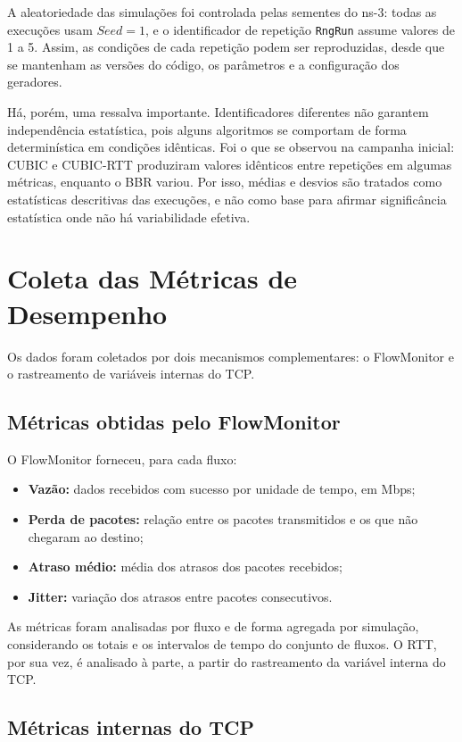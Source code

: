 A aleatoriedade das simulações foi controlada pelas sementes do ns-3: todas as execuções usam $Seed = 1$, e o identificador de repetição \texttt{RngRun} assume valores de 1 a 5. Assim, as condições de cada repetição podem ser reproduzidas, desde que se mantenham as versões do código, os parâmetros e a configuração dos geradores.

Há, porém, uma ressalva importante. Identificadores diferentes não garantem independência estatística, pois alguns algoritmos se comportam de forma determinística em condições idênticas. Foi o que se observou na campanha inicial: CUBIC e CUBIC-RTT produziram valores idênticos entre repetições em algumas métricas, enquanto o BBR variou. Por isso, médias e desvios são tratados como estatísticas descritivas das execuções, e não como base para afirmar significância estatística onde não há variabilidade efetiva.

\section{Coleta das Métricas de Desempenho}

Os dados foram coletados por dois mecanismos complementares: o FlowMonitor e o rastreamento de variáveis internas do TCP.

\subsection{Métricas obtidas pelo FlowMonitor}

O FlowMonitor forneceu, para cada fluxo:

\begin{itemize}
    \item \textbf{Vazão:} dados recebidos com sucesso por unidade de tempo, em Mbps;
    \item \textbf{Perda de pacotes:} relação entre os pacotes transmitidos e os que não chegaram ao destino;
    \item \textbf{Atraso médio:} média dos atrasos dos pacotes recebidos;
    \item \textbf{Jitter:} variação dos atrasos entre pacotes consecutivos.
\end{itemize}

As métricas foram analisadas por fluxo e de forma agregada por simulação, considerando os totais e os intervalos de tempo do conjunto de fluxos. O RTT, por sua vez, é analisado à parte, a partir do rastreamento da variável interna do TCP.

\subsection{Métricas internas do TCP}

